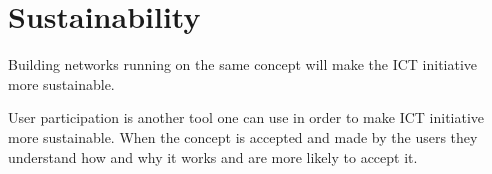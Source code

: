 \section{Sustainability\cite{jbemss:noa}}

Building networks running on the same concept will make the ICT initiative more sustainable. 

User participation is another tool one can use in order to make ICT initiative more sustainable.
When the concept is accepted and made by the users they understand how and why it works and are more likely to accept it.

